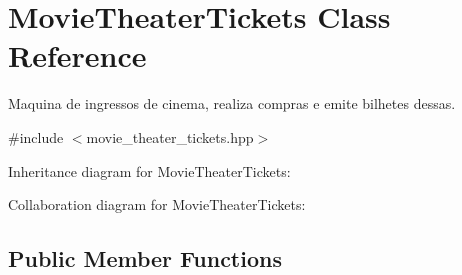\hypertarget{class_movie_theater_tickets}{}\section{Movie\+Theater\+Tickets Class Reference}
\label{class_movie_theater_tickets}


Maquina de ingressos de cinema, realiza compras e emite bilhetes dessas.  




{\ttfamily \#include $<$movie\+\_\+theater\+\_\+tickets.\+hpp$>$}



Inheritance diagram for Movie\+Theater\+Tickets\+:


Collaboration diagram for Movie\+Theater\+Tickets\+:
\subsection*{Public Member Functions}
